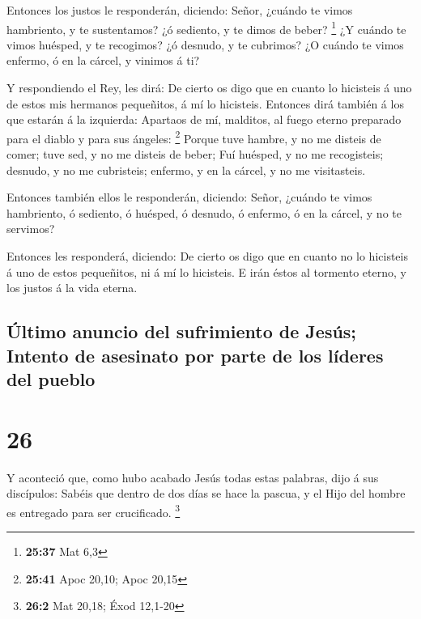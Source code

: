  Entonces los justos le responderán, diciendo: Señor,
¿cuándo te vimos hambriento, y te sustentamos? ¿ó sediento, y te dimos
de beber? \footnote{\textbf{25:37} Mat 6,3}  ¿Y cuándo te
vimos huésped, y te recogimos? ¿ó desnudo, y te cubrimos?
 ¿O cuándo te vimos enfermo, ó en la cárcel, y vinimos á
ti?

 Y respondiendo el Rey, les dirá: De cierto os digo que
en cuanto lo hicisteis á uno de estos mis hermanos pequeñitos, á mí lo
hicisteis.  Entonces dirá también á los que estarán á la
izquierda: Apartaos de mí, malditos, al fuego eterno preparado para el
diablo y para sus ángeles: \footnote{\textbf{25:41} Apoc 20,10; Apoc
  20,15}  Porque tuve hambre, y no me disteis de comer;
tuve sed, y no me disteis de beber;  Fuí huésped, y no me
recogisteis; desnudo, y no me cubristeis; enfermo, y en la cárcel, y no
me visitasteis.

 Entonces también ellos le responderán, diciendo: Señor,
¿cuándo te vimos hambriento, ó sediento, ó huésped, ó desnudo, ó
enfermo, ó en la cárcel, y no te servimos?

 Entonces les responderá, diciendo: De cierto os digo que
en cuanto no lo hicisteis á uno de estos pequeñitos, ni á mí lo
hicisteis.  E irán éstos al tormento eterno, y los justos
á la vida eterna.

\hypertarget{uxfaltimo-anuncio-del-sufrimiento-de-jesuxfas-intento-de-asesinato-por-parte-de-los-luxedderes-del-pueblo}{%
\subsection{Último anuncio del sufrimiento de Jesús; Intento de
asesinato por parte de los líderes del
pueblo}\label{uxfaltimo-anuncio-del-sufrimiento-de-jesuxfas-intento-de-asesinato-por-parte-de-los-luxedderes-del-pueblo}}

\hypertarget{section-25}{%
\section{26}\label{section-25}}

 Y aconteció que, como hubo acabado Jesús todas estas
palabras, dijo á sus discípulos:  Sabéis que dentro de dos
días se hace la pascua, y el Hijo del hombre es entregado para ser
crucificado. \footnote{\textbf{26:2} Mat 20,18; Éxod 12,1-20}

